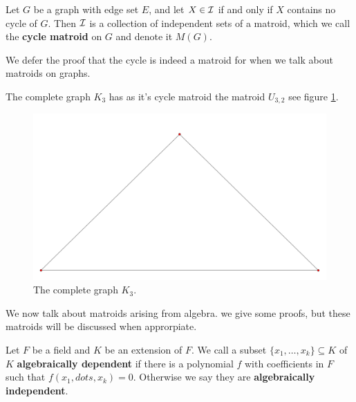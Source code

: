 \begin{definition}
    Let $G$ be a graph with edge set  $E$, and let  $X \in \mathcal{I}$ if and only if  $X$ contains no
    cycle of  $G$. Then  $\mathcal{I}$ is a collection of independent sets of a matroid, which we call the
    \textbf {cycle matroid} on $G$ and denote it  $M(G)$.		
\end{definition}

We defer the proof that the cycle is indeed a matroid for when we talk about matroids on graphs.

\begin{example}
    The complete graph $K_3$ has as it's cycle matroid the matroid  $U_{3,2}$ see figure
    \ref{fig:1.1}.
    \begin{figure}
        \centering
        \includegraphics[scale = 0.3]{Figures/Chapter1/k3cyclemat.png}
        \caption{The complete graph $K_3$.}
        \label{fig:1.1}
    \end{figure}
\end{example} 

We now talk about matroids arising from algebra. we give some proofs, but these matroids will be
discussed when approrpiate.

\begin{definition}
    Let $F$ be a field and  $K$ be an extension of $F$. We call a subset  $\{x_1, \dots, x_k\}
    \subseteq K$ of $K$ \textbf {algebraically dependent} if there is a polynomial $f$ with
    coefficients in  $F$ such that  $f(x_1, dots, x_k)=0$. Otherwise we say they are \textbf
    {algebraically independent}.
\end{definition}


